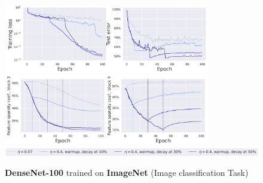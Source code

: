\begin{figure}[H]
    \centering
    \includegraphics[width=0.8\textwidth]{./pics/densen_tiny_loss.png}
    \includegraphics[width=0.8\textwidth]{./pics/densen_tiny_sparsity.png}
    \includegraphics[width=\textwidth]{./pics/densen_tiny_setup.png}
    \caption{\textbf{DenseNet-100} trained on \textbf{ImageNet}
    (Image classification Task) \label{fig: deep}}
\end{figure}


\nocite{andriushchenko2023sgd}
\nocite{shalev2014understanding}
\nocite{pillaudvivien2022label}
\printbibliography


